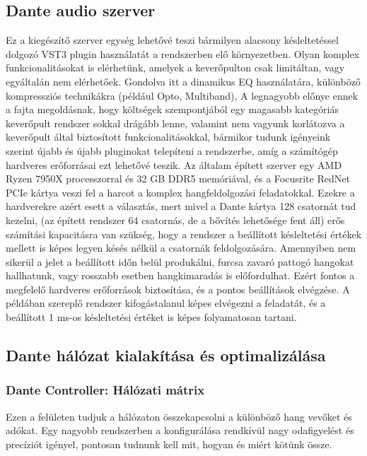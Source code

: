 \subsection{Dante audio szerver}
Ez a kiegészítő szerver egység lehetővé teszi bármilyen alacsony késleltetéssel dolgozó VST3 plugin használatát a rendszerben elő környezetben.
Olyan komplex funkcionalitásokat is elérhetünk, amelyek a keverőpulton csak limitáltan, vagy egyáltalán nem elérhetőek.
Gondolva itt a dinamikus EQ használatára, különböző kompressziós technikákra (például Opto, Multiband), 
A legnagyobb előnye ennek a fajta megoldásnak, hogy költségek szempontjából egy magasabb kategóriás keverőpult rendszer sokkal drágább lenne,
valamint nem vagyunk korlátozva a keverőpult által biztosított funkcionalitásokkal, bármikor tudunk igényeink szerint újabb és újabb pluginokat
telepíteni a rendszerbe, amíg a számítógép hardveres erőforrásai ezt lehetővé teszik.
Az általam épített szerver egy AMD Ryzen 7950X processzorral és 32 GB DDR5 memóriával, és a Focusrite RedNet PCIe kártya veszi fel a harcot a
komplex hangfeldolgozási feladatokkal. Ezekre a hardverekre azért esett a választás, mert mivel a Dante kártya 128 csatornát tud kezelni, 
(az épített rendszer 64 csatornás, de a bővítés lehetősége fent áll) erős számítási kapacitásra van szükség, hogy a rendszer a beállított
késleltetési értékek mellett is képes legyen késés nélkül a csatornák feldolgozására. Amennyiben nem sikerül a jelet a beállított időn belül
produkálni, furcsa zavaró pattogó hangokat hallhatunk, vagy rosszabb esetben hangkimaradás is előfordulhat. Ezért fontos a megfelelő hardveres
erőforrások biztosítása, és a pontos beállítások elvégzése.
A példában szereplő rendszer kifogástalanul képes elvégezni a feladatát, és a beállított 1 ms-os késleltetési értéket is képes folyamatosan tartani.
\subsection{Dante hálózat kialakítása és optimalizálása}
\subsubsection{Dante Controller: Hálózati mátrix}
Ezen a felületen tudjuk a hálózaton összekapcsolni a különböző hang vevőket és
adókat. Egy nagyobb rendszerben a konfigurálása rendkívül nagy odafigyelést és
precíziót igényel, pontosan tudnunk kell mit, hogyan és miért kötünk össze.

